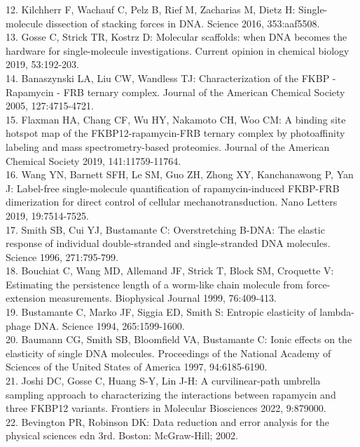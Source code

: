 \documentclass{biophys-new}
\begin{document}
12. Kilchherr F, Wachauf C, Pelz B, Rief M, Zacharias M, Dietz H: Single-molecule dissection of stacking forces in DNA. Science 2016, 353:aaf5508.\\
13. Gosse C, Strick TR, Kostrz D: Molecular scaffolds: when DNA becomes the hardware for single-molecule investigations. Current opinion in chemical biology 2019, 53:192-203.\\
14. Banaszynski LA, Liu CW, Wandless TJ: Characterization of the FKBP - Rapamycin - FRB ternary complex. Journal of the American Chemical Society 2005, 127:4715-4721.\\
15. Flaxman HA, Chang CF, Wu HY, Nakamoto CH, Woo CM: A binding site hotspot map of the FKBP12-rapamycin-FRB ternary complex by photoaffinity labeling and mass spectrometry-based proteomics. Journal of the American Chemical Society 2019, 141:11759-11764.\\
16. Wang YN, Barnett SFH, Le SM, Guo ZH, Zhong XY, Kanchanawong P, Yan J: Label-free single-molecule quantification of rapamycin-induced FKBP-FRB dimerization for direct control of cellular mechanotransduction. Nano Letters 2019, 19:7514-7525.\\
17. Smith SB, Cui YJ, Bustamante C: Overstretching B-DNA: The elastic response of individual double-stranded and single-stranded DNA molecules. Science 1996, 271:795-799.\\
18. Bouchiat C, Wang MD, Allemand JF, Strick T, Block SM, Croquette V: Estimating the persistence length of a worm-like chain molecule from force-extension measurements. Biophysical Journal 1999, 76:409-413.\\
19. Bustamante C, Marko JF, Siggia ED, Smith S: Entropic elasticity of lambda-phage DNA. Science 1994, 265:1599-1600.\\
20. Baumann CG, Smith SB, Bloomfield VA, Bustamante C: Ionic effects on the elasticity of single DNA molecules. Proceedings of the National Academy of Sciences of the United States of America 1997, 94:6185-6190.\\
21. Joshi DC, Gosse C, Huang S-Y, Lin J-H: A curvilinear-path umbrella sampling approach to characterizing the interactions between rapamycin and three FKBP12 variants. Frontiers in Molecular Biosciences 2022, 9:879000.\\
22. Bevington PR, Robinson DK: Data reduction and error analysis for the physical sciences edn 3rd. Boston: McGraw-Hill; 2002.\\
\end{document}
